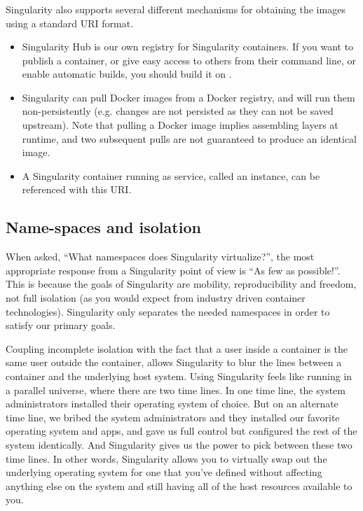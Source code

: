 \documentclass[letterpaper,10pt,english]{sphinxmanual}
\begin{document}
\subsubsection{}
\label{\detokenize{introduction:supported-uniform-resource-identifiers-uri}}
Singularity also supports several different mechanisms for obtaining the
images using a standard URI format.
\begin{itemize}
\item {} 
 Singularity Hub is our own registry for Singularity
containers. If you want to publish a container, or give easy access
to others from their command line, or enable automatic builds, you
should build it on .

\item {} 
 Singularity can pull Docker images from a Docker
registry, and will run them non-persistently (e.g. changes are not
persisted as they can not be saved upstream). Note that pulling a
Docker image implies assembling layers at runtime, and two subsequent
pulls are not guaranteed to produce an identical image.

\item {} 
 A Singularity container running as service, called an
instance, can be referenced with this URI.

\end{itemize}


\subsection{Name-spaces and isolation}
\label{\detokenize{introduction:name-spaces-and-isolation}}
When asked, “What namespaces does Singularity virtualize?”, the most
appropriate response from a Singularity point of view is “As few as
possible!”. This is because the goals of Singularity are mobility,
reproducibility and freedom, not full isolation (as you would expect
from industry driven container technologies). Singularity only
separates the needed namespaces in order to satisfy our primary goals.

Coupling incomplete isolation with the fact that a user inside a
container is the same user outside the container, allows Singularity
to blur the lines between a container and the underlying host system.
Using Singularity feels like running in a parallel universe, where
there are two time lines. In one time line, the system administrators
installed their operating system of choice. But on an alternate
time line, we bribed the system administrators and they installed our
favorite operating system and apps, and gave us full control but
configured the rest of the system identically. And Singularity gives
us the power to pick between these two time lines.
In other words, Singularity allows you to virtually swap out the
underlying operating system for one that you’ve defined without
affecting anything else on the system and still having all of the host
resources available to you.
\end{document}
